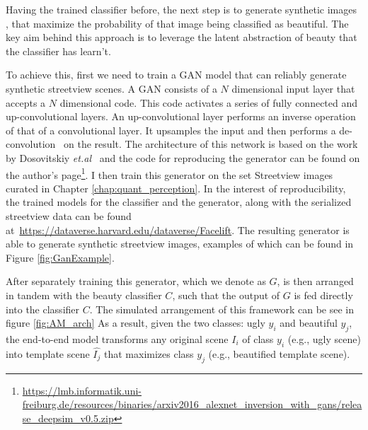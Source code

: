 Having the trained classifier before, the next step is to generate synthetic images , that maximize the probability of that image being classified as beautiful. The key aim behind this approach is to leverage the latent abstraction of beauty that the classifier has learn't. 

To achieve this, first we need to train a GAN model that can reliably generate synthetic streetview scenes. A GAN consists of a $N$ dimensional input layer that accepts a $N$ dimensional code. This code activates a series of fully connected and up-convolutional layers. An up-convolutional layer performs an inverse operation of that of a convolutional layer. It upsamples the input and then performs a de-convolution~\cite{dosovitskiy2015learning} on the result. The architecture of this network is based on the work by Dosovitskiy \textit{et.al}~\cite{dosovitskiy2016generating} and the code for reproducing the generator can be found on the author's page\footnote{ \url{https://lmb.informatik.uni-freiburg.de/resources/binaries/arxiv2016_alexnet_inversion_with_gans/release_deepsim_v0.5.zip}}. 
I then train this generator on the set Streetview images curated in Chapter \ref{chap:quant_perception}. In the interest of reproducibility, the trained models for the classifier and the generator, along with the serialized streetview data can be found at~\url{https://dataverse.harvard.edu/dataverse/Facelift}. The resulting generator is able to generate synthetic streetview images, examples of which can be found in Figure \ref{fig:GanExample}. 

After separately training this generator, which we denote as $G$, is then arranged in tandem with the beauty classifier $C$, such that the output of $G$ is fed directly into the classifier $C$.
The simulated arrangement of this framework can be see in figure \ref{fig:AM_arch} 
As a result, given the two classes: ugly $y_i$ and beautiful $y_j$, the end-to-end model  transforms any original scene $I_i$ of class $y_i$ (e.g., ugly scene) into template scene $\hat{I_j}$ that maximizes class $y_j$ (e.g., beautified template scene). 

